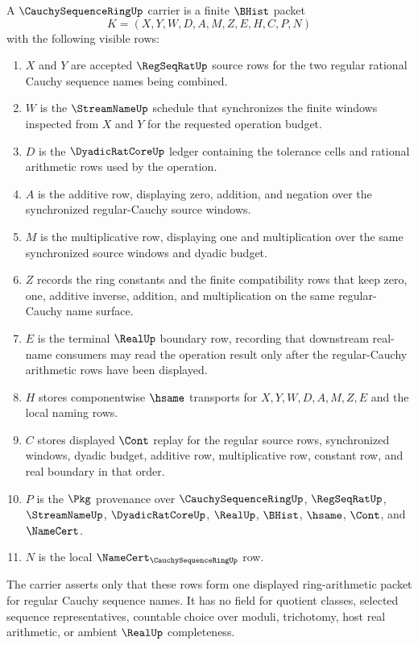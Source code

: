 \begin{definition}
\label{def:cauchy-sequence-ring-carrier}
A $\CauchySequenceRingUp$ carrier is a finite $\BHist$ packet
$$
K=(X,Y,W,D,A,M,Z,E,H,C,P,N)
$$
with the following visible rows:
\begin{enumerate}
\item $X$ and $Y$ are accepted $\RegSeqRatUp$ source rows for the two regular rational Cauchy sequence names being combined.
\item $W$ is the $\StreamNameUp$ schedule that synchronizes the finite windows inspected from $X$ and $Y$ for the requested operation budget.
\item $D$ is the $\DyadicRatCoreUp$ ledger containing the tolerance cells and rational arithmetic rows used by the operation.
\item $A$ is the additive row, displaying zero, addition, and negation over the synchronized regular-Cauchy source windows.
\item $M$ is the multiplicative row, displaying one and multiplication over the same synchronized source windows and dyadic budget.
\item $Z$ records the ring constants and the finite compatibility rows that keep zero, one, additive inverse, addition, and multiplication on the same regular-Cauchy name surface.
\item $E$ is the terminal $\RealUp$ boundary row, recording that downstream real-name consumers may read the operation result only after the regular-Cauchy arithmetic rows have been displayed.
\item $H$ stores componentwise $\hsame$ transports for $X,Y,W,D,A,M,Z,E$ and the local naming rows.
\item $C$ stores displayed $\Cont$ replay for the regular source rows, synchronized windows, dyadic budget, additive row, multiplicative row, constant row, and real boundary in that order.
\item $P$ is the $\Pkg$ provenance over $\CauchySequenceRingUp$, $\RegSeqRatUp$, $\StreamNameUp$, $\DyadicRatCoreUp$, $\RealUp$, $\BHist$, $\hsame$, $\Cont$, and $\NameCert$.
\item $N$ is the local $\NameCert_{\CauchySequenceRingUp}$ row.
\end{enumerate}
The carrier asserts only that these rows form one displayed ring-arithmetic packet for regular Cauchy sequence names. It has no field for quotient classes, selected sequence representatives, countable choice over moduli, trichotomy, host real arithmetic, or ambient $\RealUp$ completeness.
\end{definition}

